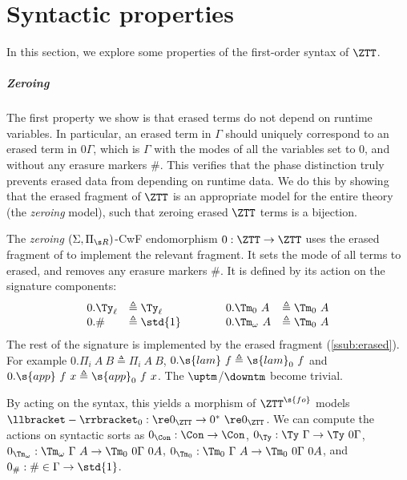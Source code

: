 \section{Syntactic properties}\label{sec:models-of-itt}

In this section, we explore some properties of the first-order syntax of $\ZTT$.

\subparagraph{Zeroing}
The first property we show is that erased terms do not depend on runtime
variables. In particular, an erased term in $\Gamma$ should uniquely correspond
to an erased term in $0\Gamma$, which is $\Gamma$ with the modes of all the
variables set to 0, and without any erasure markers $\#$. This verifies that the
phase distinction truly prevents erased data from depending on runtime data. We
do this by showing that the erased fragment of $\ZTT$ is an appropriate model
for the entire theory (the \emph{zeroing} model), such that zeroing erased $\ZTT$
terms is a bijection.

\begin{definition}\label{def:zeroing-model}
  The \emph{zeroing}
  $(\Sigma, \Pi_{\s R})$-CwF endomorphism $0 : \ZTT \to \ZTT$ uses the erased fragment of
  \ZTT to implement the relevant fragment. It sets the mode of all terms to
  erased, and removes any erasure markers $\#$. It is defined by its action on the signature components:
  \[\begin{array}{ll@{\qquad\qquad}ll}
  0.\Ty_\ell      &\triangleq \Ty_\ell  &
  0.\Tm_0\ A      &\triangleq \Tm_0\ A  \\
  0.\#            &\triangleq \std{1}  &
  0.\Tm_\omega\ A &\triangleq \Tm_0\ A
  \end{array}\]
  The rest of the signature is implemented by the erased fragment (\cref{ssub:erased}).
  For example $0.\Pi_i\ A\ B \triangleq \Pi_i\ A\ B$, $0.\s{lam}\ f
  \triangleq \s{lam}_0\ f$ and $0.\s{app}\ f\ x \triangleq \s{app}_0\ f\ x$. The
  $\uptm$/$\downtm$ become trivial.
\end{definition}

By acting on the syntax, this yields a morphism of $\ZTT^{\s{fo}}$ models $\llbracket-\rrbracket_0 : \re 0_{\ZTT}
\to 0^*\ \re 0_{\ZTT}$. We can compute the actions on syntactic sorts as
$0_{\Con} : \Con \to \Con$,
$0_{\Ty} : \Ty\ \Gamma \to \Ty\ 0\Gamma$,
$0_{\Tm_\omega} : \Tm_\omega\ \Gamma\ A \to \Tm_0\ 0\Gamma\ 0A$,
$0_{\Tm_0} : \Tm_0\ \Gamma\ A \to \Tm_0\ 0\Gamma\ 0A$,
and
$0_{\#} : \# \in \Gamma \to \std{1}$.

